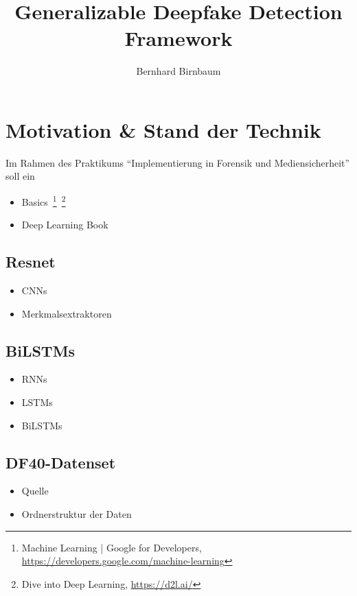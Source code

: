 \documentclass{article}
\title{Generalizable Deepfake Detection Framework}
\author{Bernhard Birnbaum}
\begin{document}
    \maketitle

    \section{Motivation \& Stand der Technik}
    Im Rahmen des Praktikums \enquote{Implementierung in Forensik und Mediensicherheit} soll ein 
    \begin{itemize}
        \item Basics~\footnote{Machine Learning | Google for Developers, \url{https://developers.google.com/machine-learning}}~\footnote{Dive into Deep Learning, \url{https://d2l.ai/}}
        \item Deep Learning Book~\cite{deeplearningbook}
    \end{itemize}
    \subsection{Resnet}
    \begin{itemize}
        \item CNNs
        \item Merkmalsextraktoren %
    \end{itemize}
    \subsection{BiLSTMs}
    \begin{itemize}
        \item RNNs
        \item LSTMs
        \item BiLSTMs %
    \end{itemize}
    \subsection{DF40-Datenset}
    \begin{itemize}
        \item Quelle~\cite{yan2024df40}
        \item Ordnerstruktur der Daten
    \end{itemize}
\end{document}
